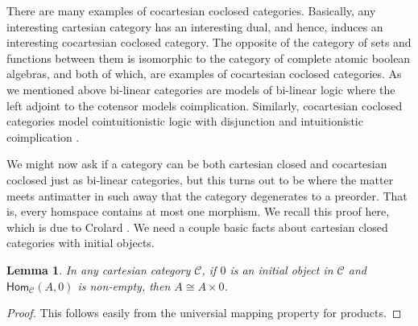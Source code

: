\documentclass{lmcs}
\newtheorem{lemma}[theorem]{Lemma}
\newcommand{\cat}[1]{\mathcal{#1}}
\newcommand{\Hom}[3]{\mathsf{Hom}_{\cat{#1}}(#2,#3)}
\begin{document}
There are many examples of cocartesian coclosed categories.
Basically, any interesting cartesian category has an interesting dual,
and hence, induces an interesting cocartesian coclosed category.
The opposite of the category of sets and functions between them is
isomorphic to the category of complete atomic boolean algebras, and
both of which, are examples of cocartesian coclosed categories.  As
we mentioned above bi-linear categories \cite{Cockett:1997a} are
models of bi-linear logic where the left adjoint to the cotensor
models coimplication.  Similarly, cocartesian coclosed categories
model cointuitionistic logic with disjunction and intuitionistic
coimplication \cite{Crolard:2001,Bellin:2012}. 

We might now ask if a category can be both cartesian closed and
cocartesian coclosed just as bi-linear categories, but this turns out
to be where the matter meets antimatter in such away that the category
degenerates to a preorder.  That is, every homspace contains at most
one morphism.  We recall this proof here, which is due to Crolard
\cite{Crolard:2001}. We need a couple basic facts about cartesian
closed categories with initial objects.
\begin{lemma}
  \label{lemma:iso-prod-initial}
  In any cartesian category $\cat{C}$, if $0$ is an initial object in
  $\cat{C}$ and $\Hom{C}{A}{0}$ is non-empty, then $A \cong A \times 0$.
\end{lemma}
\begin{proof}
  This follows easily from the universial mapping property for products.
\end{proof}
\end{document}
